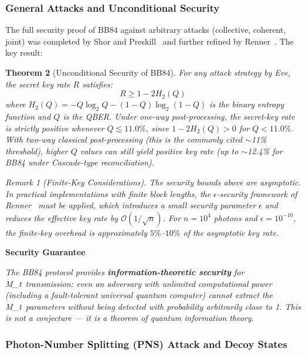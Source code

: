 \documentclass[11pt,a4paper]{article}
\theoremstyle{plain}
\newtheorem{theorem}{Theorem}[section]
\theoremstyle{definition}
\theoremstyle{remark}
\newtheorem{remark}[theorem]{Remark}
\newenvironment{bilingual}[2]{%
  \medskip\noindent\textbf{#1}\par\noindent\textit{#2}\par\smallskip
}{}
\newcommand{\Mt}{M_t}
\begin{document}
\subsubsection{General Attacks and Unconditional Security}

The full security proof of BB84 against arbitrary attacks (collective,
coherent, joint) was completed by Shor and Preskill~\cite{shor_preskill2000}
and further refined by Renner~\cite{renner2005}. The key result:

\begin{theorem}[Unconditional Security of BB84]
\label{thm:unconditional}
For any attack strategy by Eve, the secret key rate $R$ satisfies:
\[
R \geq 1 - 2H_2(Q)
\]
where $H_2(Q) = -Q\log_2 Q - (1-Q)\log_2(1-Q)$ is the binary entropy
function and $Q$ is the QBER. Under one-way post-processing, the secret-key
rate is strictly positive whenever $Q \lesssim 11.0\%$, since
$1 - 2H_2(Q) > 0$ for $Q < 11.0\%$. With two-way classical post-processing
(this is the commonly cited $\sim$11\% threshold), higher $Q$ values can still
yield positive key rate (up to $\sim$12.4\% for BB84 under Cascade-type
reconciliation).

\begin{remark}[Finite-Key Considerations]
The security bounds above are asymptotic. In practical implementations with
finite block lengths, the $\epsilon$-security framework of
Renner~\cite{renner2005} must be applied, which introduces a small security
parameter $\epsilon$ and reduces the effective key rate by
$\mathcal{O}(1/\sqrt{n})$. For $n = 10^4$ photons and $\epsilon = 10^{-10}$,
the finite-key overhead is approximately $5\%$--$10\%$ of the asymptotic
key rate.
\end{remark}
\end{theorem}

\begin{bilingual}
{Security Guarantee}
{The BB84 protocol provides \textbf{information-theoretic security} for
\Mt\ transmission: even an adversary with unlimited computational power
(including a fault-tolerant universal quantum computer) cannot extract
the \Mt\ parameters without being detected with probability arbitrarily
close to 1. This is not a conjecture — it is a theorem of quantum
information theory.}
\end{bilingual}

\subsubsection{Photon-Number Splitting (PNS) Attack and Decoy States}
\end{document}
